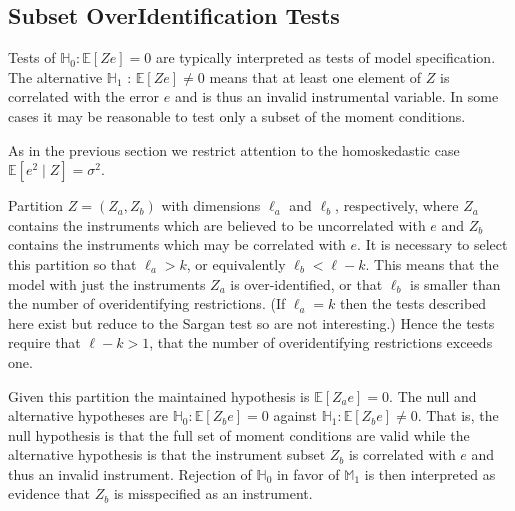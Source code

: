 \documentclass[10pt]{article}
\begin{document}
\subsection{Subset OverIdentification Tests}
Tests of $\mathbb{H}_{0}: \mathbb{E}[Z e]=0$ are typically interpreted as tests of model specification. The alternative $\mathbb{H}_{1}$ : $\mathbb{E}[Z e] \neq 0$ means that at least one element of $Z$ is correlated with the error $e$ and is thus an invalid instrumental variable. In some cases it may be reasonable to test only a subset of the moment conditions.

As in the previous section we restrict attention to the homoskedastic case $\mathbb{E}\left[e^{2} \mid Z\right]=\sigma^{2}$.

Partition $Z=\left(Z_{a}, Z_{b}\right)$ with dimensions $\ell_{a}$ and $\ell_{b}$, respectively, where $Z_{a}$ contains the instruments which are believed to be uncorrelated with $e$ and $Z_{b}$ contains the instruments which may be correlated with $e$. It is necessary to select this partition so that $\ell_{a}>k$, or equivalently $\ell_{b}<\ell-k$. This means that the model with just the instruments $Z_{a}$ is over-identified, or that $\ell_{b}$ is smaller than the number of overidentifying restrictions. (If $\ell_{a}=k$ then the tests described here exist but reduce to the Sargan test so are not interesting.) Hence the tests require that $\ell-k>1$, that the number of overidentifying restrictions exceeds one.

Given this partition the maintained hypothesis is $\mathbb{E}\left[Z_{a} e\right]=0$. The null and alternative hypotheses are $\mathbb{H}_{0}: \mathbb{E}\left[Z_{b} e\right]=0$ against $\mathbb{H}_{1}: \mathbb{E}\left[Z_{b} e\right] \neq 0$. That is, the null hypothesis is that the full set of moment conditions are valid while the alternative hypothesis is that the instrument subset $Z_{b}$ is correlated with $e$ and thus an invalid instrument. Rejection of $\mathbb{H}_{0}$ in favor of $\mathbb{M}_{1}$ is then interpreted as evidence that $Z_{b}$ is misspecified as an instrument.
\end{document}
